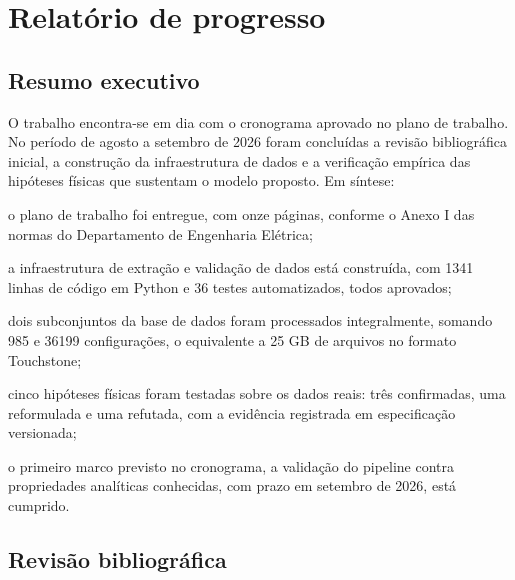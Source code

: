 
\chapter{Relatório de progresso}
\label{cap:relatorio}

\section{Resumo executivo}
\label{sec:resumo}

O trabalho encontra-se em dia com o cronograma aprovado no plano de trabalho. No
período de agosto a setembro de 2026 foram concluídas a revisão bibliográfica
inicial, a construção da infraestrutura de dados e a verificação empírica das
hipóteses físicas que sustentam o modelo proposto. Em síntese:

\begin{alineas}
\item o plano de trabalho foi entregue, com onze páginas, conforme o Anexo I das
normas do Departamento de Engenharia Elétrica;

\item a infraestrutura de extração e validação de dados está construída, com
1341 linhas de código em Python e 36 testes automatizados, todos aprovados;

\item dois subconjuntos da base de dados foram processados integralmente,
somando 985 e 36199 configurações, o equivalente a 25 GB de arquivos no formato
Touchstone;

\item cinco hipóteses físicas foram testadas sobre os dados reais: três
confirmadas, uma reformulada e uma refutada, com a evidência registrada em
especificação versionada;

\item o primeiro marco previsto no cronograma, a validação do pipeline contra
propriedades analíticas conhecidas, com prazo em setembro de 2026, está
cumprido.
\end{alineas}

\section{Revisão bibliográfica}
\label{sec:revisao}

